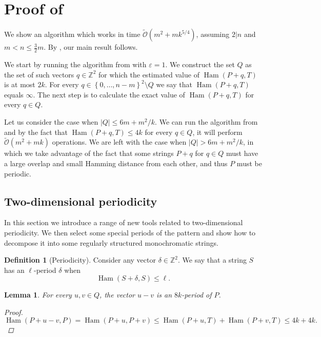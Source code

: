 \documentclass[11pt]{article}
\newcommand{\Z}{\mathbb{Z}}
\newcommand{\tO}{\tilde{\mathcal{O}}}
\newcommand{\set}[1]{\left\lbrace #1 \right\rbrace}
\theoremstyle{plain}
\newtheorem{lemma}{Lemma}
\theoremstyle{definition}
\newtheorem{definition}{Definition}
\theoremstyle{remark}
\DeclareMathOperator*{\Ham}{Ham}
\begin{document}
\section{Proof of }
We show an algorithm which works in time $\tO(m^2 + mk^{5/4})$, assuming $2|n$ and $m < n \le \frac{3}{2}m$.
By , our main result follows.

We start by running the algorithm from  with $\varepsilon = 1$.
We construct the set $Q$ as the set of such vectors $q \in \Z^2$ for which the estimated value of $\Ham(P + q, T)$ is at most $2k$.
For every $q \in \set{0, \dots, n - m}^2 \setminus Q$ we say that $\Ham(P + q, T)$ equals $\infty$.
The next step is to calculate the exact value of $\Ham(P + q, T)$ for every $q \in Q$.

Let us consider the case when $|Q| \le 6m + m^2/k$.
We can run the algorithm from  and by the fact that $\Ham(P + q, T) \le 4k$ for every $q \in Q$, it will perform $\tO(m^2 + mk)$ operations.
We are left with the case when $|Q| > 6m + m^2/k$, in which we take advantage of the fact that some strings $P + q$ for $q \in Q$ must have a large overlap and small Hamming distance from each other, and thus $P$ must be periodic.


\newcommand{\T}{\mathcal{T}}
\renewcommand{\S}{\mathcal{S}}
\renewcommand{\P}{\mathcal{P}}
\newcommand{\U}{\mathcal{U}}
\newcommand{\V}{\mathcal{V}}
\newcommand{\F}{\mathcal{F}}
\renewcommand{\L}{\mathcal{L}}


\subsection{Two-dimensional periodicity} \label{periodicity_section}
In this section we introduce a range of new tools related to two-dimensional periodicity.
We then select some special periods of the pattern and show how to decompose it into some regularly structured monochromatic strings.


\begin{definition}[Periodicity]
	Consider any vector $\delta \in \Z^2$.
	We say that a string $S$ has an $\ell$-period $\delta$ when
	$$ \Ham(S + \delta, S) \le \ell. $$
\end{definition}


\begin{lemma} \label{periodicity_lemma}
	For every $u, v \in Q$, the vector $u - v$ is an $8k$-period of $P$.
	\begin{proof}
		$\Ham(P + u - v, P) = \Ham(P + u, P + v) \le \Ham(P + u, T) + \Ham(P + v, T) \le 4k + 4k. $
	\end{proof}
\end{lemma}
\end{document}
